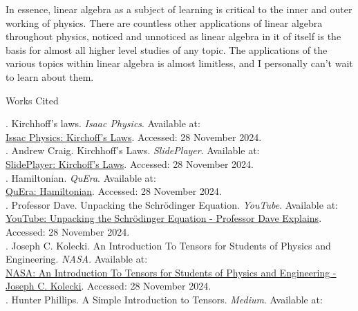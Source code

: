 \documentclass[12pt,letterpaper, onecolumn]{exam}
\begin{document}
\begingroup
In essence, linear algebra as a subject of learning is critical to the inner and outer working 
of physics. There are countless other applications of linear algebra throughout physics, 
noticed and unnoticed as linear algebra in it of itself is the basis for almost all higher level 
studies of any topic. The applications of the various topics within linear algebra is almost 
limitless, and I personally can't wait to learn about them.
\endgroup

\newpage
\thispagestyle{empty}
\begingroup %
    \centering
    \LARGE Works Cited\\
\endgroup
\vspace{2em}

. Kirchhoff's laws. \textit{Isaac Physics}. Available at:\\ 
\href{https://isaacphysics.org/concepts/cp_kirchhoffs_laws}{Issac Physics: Kirchoff's Laws}. Accessed: 28 November 2024.
\vspace{1em}\\
. Andrew Craig. Kirchhoff's Laws. \textit{SlidePlayer}. Available at:\\ 
\href{https://slideplayer.com/slide/13365572/}{SlidePlayer: Kirchoff's Laws}. Accessed: 28 November 2024.
\vspace{1em}\\
. Hamiltonian. \textit{QuEra}. Available at:\\
\href{https://www.quera.com/glossary/hamiltonian}{QuEra: Hamiltonian}. Accessed: 28 November 2024.
\vspace{1em}\\
. Professor Dave. Unpacking the Schrödinger Equation. \textit{YouTube}. Available at:\\ 
\href{https://www.youtube.com/watch?app=desktop&v=l4fFG2utivw}{YouTube: Unpacking the Schrödinger Equation - Professor Dave Explains}. Accessed: 28 November 2024.
\vspace{1em}\\
. Joseph C. Kolecki. An Introduction To Tensors for Students of Physics and Engineering. \textit{NASA}. Available at:\\
\href{https://www.grc.nasa.gov/www/k-12/Numbers/Math/documents/Tensors_TM2002211716.pdf}{NASA: An Introduction To Tensors for Students of Physics and Engineering - Joseph C. Kolecki}. Accessed: 28 November 2024.
\vspace{1em}\\
. Hunter Phillips. A Simple Introduction to Tensors. \textit{Medium}. Available at:\\
\end{document}
